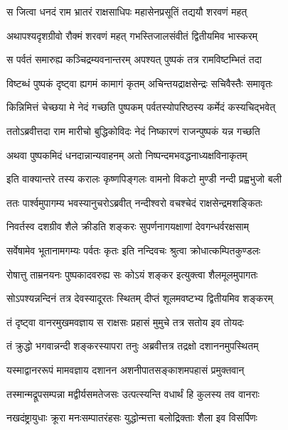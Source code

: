 
\twolineshloka
{स जित्वा धनदं राम भ्रातरं राक्षसाधिपः}
{महासेनप्रसूतिं तद्ययौ शरवणं महत्} %

\twolineshloka
{अथापश्यदृशग्रीवो रौक्मं शरवणं महत्}
{गभस्तिजालसंवीतं द्वितीयमिव भास्करम्} %

\twolineshloka
{स पर्वतं समारुह्य कञ्चिद्रम्यवनान्तरम्}
{अपश्यत् पुष्पकं तत्र रामविष्टम्भितं तदा} %

\twolineshloka
{विष्टब्धं पुष्पकं दृष्ट्वा ह्यगमं कामागं कृतम्}
{अचिन्तयद्राक्षसेन्द्रः सचिवैस्तैः समावृतः} %

\twolineshloka
{किन्निमित्तं चेच्छया मे नेदं गच्छति पुष्पकम्}
{पर्वतस्योपरिष्ठस्य कर्मेदं कस्यचिद्भवेत्} %

\twolineshloka
{ततोऽब्रवीत्तदा राम मारीचो बुद्धिकोविदः}
{नेदं निष्कारणं राजन्पुष्पकं यन्न गच्छति} %

\twolineshloka
{अथवा पुष्पकमिदं धनदान्नान्यवाहनम्}
{अतो निष्पन्दमभवद्धनाध्यक्षविनाकृतम्} %

\twolineshloka
{इति वाक्यान्तरे तस्य करालः कृष्णपिङ्गलः}
{वामनो विकटो मुण्डी नन्दी प्रह्वभुजो बली} %

\twolineshloka
{ततः पार्श्वमुपागम्य भवस्यानुचरोऽब्रवीत्}
{नन्दीश्वरो वचश्चेदं राक्षसेन्द्रमशङ्कितः} %

\twolineshloka
{निवर्तस्व दशग्रीव शैले क्रीडति शङ्करः}
{सुपर्णनागयक्षाणां देवगन्धर्वरक्षसाम्} %

\twolineshloka
{सर्वेषामेव भूतानामगम्यः पर्वतः कृतः}
{इति नन्दिवचः श्रुत्वा क्रोधात्कम्पितकुण्डलः} %

\twolineshloka
{रोषात्तु ताम्रनयनः पुष्पकादवरुह्य सः}
{कोऽयं शङ्कर इत्युक्त्वा शैलमूलमुपागतः} %

\twolineshloka
{सोऽपश्यन्नन्दिनं तत्र देवस्यादूरतः स्थितम्}
{दीप्तं शूलमवष्टभ्य द्वितीयमिव शङ्करम्} %

\twolineshloka
{तं दृष्ट्वा वानरमुखमवज्ञाय स राक्षसः}
{प्रहासं मुमुचे तत्र सतोय इव तोयदः} %

\twolineshloka
{तं क्रुद्धो भगवान्नन्दी शङ्करस्यापरा तनुः}
{अब्रवीत्तत्र तद्रक्षो दशाननमुपस्थितम्} %

\twolineshloka
{यस्माद्वानररूपं मामवज्ञाय दशानन}
{अशनीपातसङ्काशमपहासं प्रमुक्तवान्} %

\twolineshloka
{तस्मान्मद्रूपसम्पन्ना मद्वीर्यसमतेजसः}
{उत्पत्स्यन्ति वधार्थं हि कुलस्य तव वानराः} %

\twolineshloka
{नखदंष्ट्रायुधाः क्रूरा मनःसम्पातरंहसः}
{युद्धोन्मत्ता बलोद्रिक्ताः शैला इव विसर्पिणः} %

